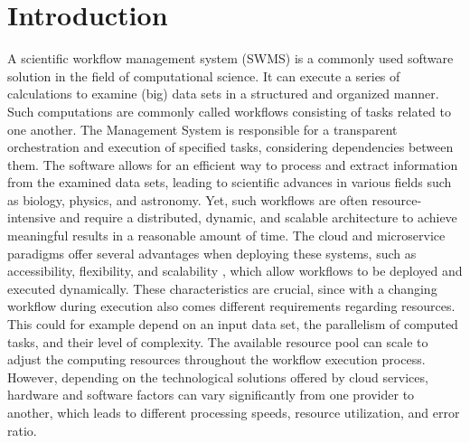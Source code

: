 \documentclass[a4paper,journal]{IEEEtran}
\begin{document}

\section{Introduction}
A scientific workflow management system (SWMS) is a commonly used software solution in the field of computational science. It can execute a series of calculations to examine (big) data sets in a structured and organized manner. Such computations are commonly called workflows consisting of tasks related to one another. The Management System is responsible for a transparent orchestration and execution of specified tasks, considering dependencies between them. The software allows for an efficient way to process and extract information from the examined data sets, leading to scientific advances in various fields such as biology, physics, and astronomy\cite{gil2007examiningchallengesscientific}. Yet, such workflows are often resource-intensive and require a distributed, dynamic, and scalable architecture to achieve meaningful results in a reasonable amount of time. The cloud and microservice paradigms offer several advantages when deploying these systems, such as accessibility, flexibility, and scalability \cite{apostu2013study}, which allow workflows to be deployed and executed dynamically. These characteristics are crucial, since with a changing workflow during execution also comes different requirements regarding resources. This could for example depend on an input data set, the parallelism of computed tasks, and their level of complexity. The available resource pool can scale to adjust the computing resources throughout the workflow execution process. However, depending on the technological solutions offered by cloud services, hardware and software factors can vary significantly from one provider to another, which leads to different processing speeds, resource utilization, and error ratio\cite{aljamal2018comparativereviewhighperformance}.
\end{document}
